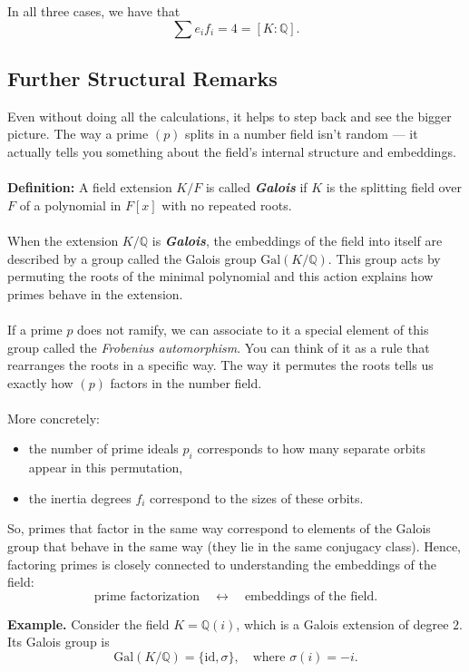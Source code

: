 In all three cases, we have that
\[
\sum e_i f_i=4=[K:\mathbb Q].
\]
\subsection{Further Structural Remarks}
Even without doing all the calculations, it helps to step back and see the bigger picture. The way a prime $(p)$ splits in a number field isn’t random --- it actually tells you something about the field’s internal structure and embeddings.
\\\\
\textbf{Definition:} A field extension $K/F$ is called \textbf{\textit{Galois}} if $K$ is the splitting field over $F$ of a polynomial in $F[x]$ with no repeated roots.\\\\
When the extension $K/\mathbb{Q}$ is \textbf{\textit{Galois}}, the embeddings of the field into itself are described by a group called the Galois group $\mathrm{Gal}(K/\mathbb{Q})$. This group acts by permuting the roots of the minimal polynomial and this action explains how primes behave in the extension.
\\\\
If a prime $p$ does not ramify, we can associate to it a special element of this group called the \emph{Frobenius automorphism}. You can think of it as a rule that rearranges the roots in a specific way. The way it permutes the roots tells us exactly how $(p)$ factors in the number field.
\\\\

More concretely:
\begin{itemize}
\item the number of prime ideals $p_i$ corresponds to how many separate orbits appear in this permutation,
\item the inertia degrees $f_i$ correspond to the sizes of these orbits.
\end{itemize}
So, primes that factor in the same way correspond to elements of the Galois group that behave in the same way (they lie in the same conjugacy class). Hence, factoring primes is closely connected to understanding the embeddings of the field:
\[
\text{prime factorization} \quad \longleftrightarrow \quad \text{embeddings of the field}.
\]

\textbf{Example.} Consider the field $K = \mathbb{Q}(i)$, which is a Galois extension of degree $2$. Its Galois group is
\[
\mathrm{Gal}(K/\mathbb{Q}) = \{ \mathrm{id}, \sigma \}, \quad \text{where } \sigma(i) = -i.
\]

